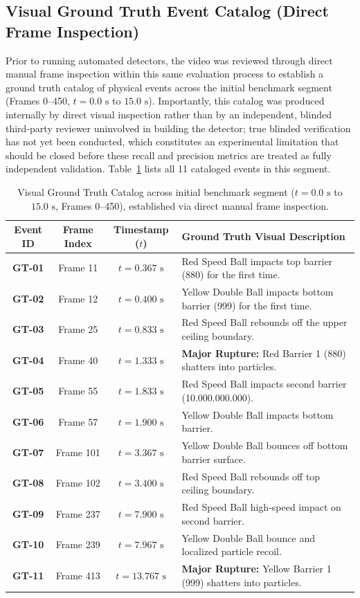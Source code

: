 \documentclass[11pt]{article}
\begin{document}
\subsection{Visual Ground Truth Event Catalog (Direct Frame Inspection)}

Prior to running automated detectors, the video was reviewed through direct manual frame inspection within this same evaluation process to establish a ground truth catalog of physical events across the initial benchmark segment (Frames 0--450, $t = 0.0\text{ s}$ to $15.0\text{ s}$). Importantly, this catalog was produced internally by direct visual inspection rather than by an independent, blinded third-party reviewer uninvolved in building the detector; true blinded verification has not yet been conducted, which constitutes an experimental limitation that should be closed before these recall and precision metrics are treated as fully independent validation. Table~\ref{tab:ground_truth} lists all 11 cataloged events in this segment.

\begin{table}[t]
\caption{Visual Ground Truth Catalog across initial benchmark segment ($t = 0.0\text{ s}$ to $15.0\text{ s}$, Frames 0--450), established via direct manual frame inspection.}
\label{tab:ground_truth}
\centering
\small
\begin{tabular}{@{}cccl@{}}
\toprule
Event ID & Frame Index & Timestamp ($t$) & Ground Truth Visual Description \\
\midrule
\textbf{GT-01} & Frame 11  & $t = 0.367\text{ s}$ & Red Speed Ball impacts top barrier (880) for the first time. \\
\textbf{GT-02} & Frame 12  & $t = 0.400\text{ s}$ & Yellow Double Ball impacts bottom barrier (999) for the first time. \\
\textbf{GT-03} & Frame 25  & $t = 0.833\text{ s}$ & Red Speed Ball rebounds off the upper ceiling boundary. \\
\textbf{GT-04} & Frame 40  & $t = 1.333\text{ s}$ & \textbf{Major Rupture:} Red Barrier 1 (880) shatters into particles. \\
\textbf{GT-05} & Frame 55  & $t = 1.833\text{ s}$ & Red Speed Ball impacts second barrier (10.000.000.000). \\
\textbf{GT-06} & Frame 57  & $t = 1.900\text{ s}$ & Yellow Double Ball impacts bottom barrier. \\
\textbf{GT-07} & Frame 101 & $t = 3.367\text{ s}$ & Yellow Double Ball bounces off bottom barrier surface. \\
\textbf{GT-08} & Frame 102 & $t = 3.400\text{ s}$ & Red Speed Ball rebounds off top ceiling boundary. \\
\textbf{GT-09} & Frame 237 & $t = 7.900\text{ s}$ & Red Speed Ball high-speed impact on second barrier. \\
\textbf{GT-10} & Frame 239 & $t = 7.967\text{ s}$ & Yellow Double Ball bounce and localized particle recoil. \\
\textbf{GT-11} & Frame 413 & $t = 13.767\text{ s}$ & \textbf{Major Rupture:} Yellow Barrier 1 (999) shatters into particles. \\
\bottomrule
\end{tabular}
\end{table}
\end{document}
